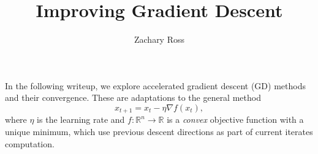 \documentclass{article}
\title{Improving Gradient Descent}
\author{Zachary Ross}
\newcommand{\R}{\mathbb R}
\theoremstyle{definition}
\begin{document}
\maketitle

In the following writeup, we explore accelerated gradient descent (GD) methods
and their convergence. These are adaptations to the general method
\begin{equation}
    \label{eq:gd}
    x_{t + 1} = x_t - \eta \nabla f(x_t),
\end{equation} where $\eta$ is the learning rate and $f: \R^n \rightarrow \R$ is
a \emph{convex} objective function with a unique minimum, which use previous
descent directions as part of current iterates computation. 


\tableofcontents

\pagebreak







\end{document}
